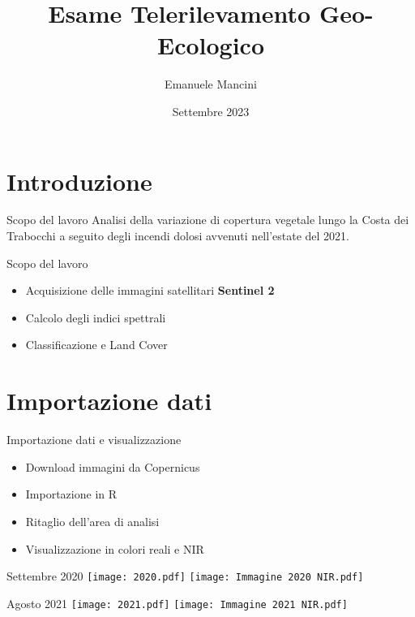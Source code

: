 \documentclass{beamer}
\title{Esame Telerilevamento Geo-Ecologico}
\author{Emanuele Mancini}
\institute{\large Alma Mater Studiorum - Università di Bologna}
\date{Settembre 2023}
\begin{document}
\maketitle

\section{Introduzione}

\begin{frame}{Scopo del lavoro}
Analisi della variazione di copertura vegetale lungo la Costa dei Trabocchi a seguito degli incendi dolosi avvenuti nell'estate del 2021.
\end{frame}

\begin{frame}{Scopo del lavoro}
\begin{itemize}
    \item Acquisizione delle immagini satellitari \textbf{Sentinel 2}
    \item \pause Calcolo degli indici spettrali
    \item \pause Classificazione e Land Cover
\end{itemize}    
\end{frame}

\section{Importazione dati}

\begin{frame}{Importazione dati e visualizzazione}
\begin{itemize}
    \item Download immagini da Copernicus
    \item \pause Importazione in R
    \item \pause Ritaglio dell'area di analisi
    \item \pause Visualizzazione in colori reali e NIR
\end{itemize}
    
\end{frame}

\begin{frame}{Settembre 2020}
\centering
\texttt{[image: 2020.pdf]}
\texttt{[image: Immagine 2020 NIR.pdf]}
\end{frame}

\begin{frame}{Agosto 2021}
\centering
\texttt{[image: 2021.pdf]}
\texttt{[image: Immagine 2021 NIR.pdf]}
\end{frame}
\end{document}

